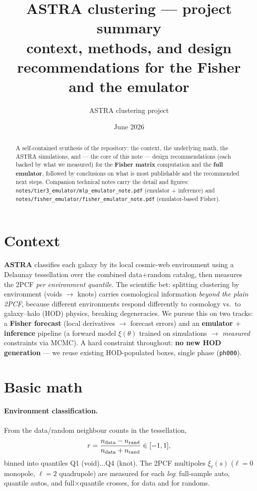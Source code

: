 \documentclass[11pt]{article}
\title{ASTRA clustering --- project summary\\
\large context, methods, and design recommendations for the Fisher and the emulator}
\author{ASTRA clustering project}\date{June 2026}
\newcommand{\code}[1]{\texttt{#1}}
\begin{document}
\maketitle

\begin{abstract}
A self-contained synthesis of the repository: the context, the underlying math, the
ASTRA simulations, and --- the core of this note --- design recommendations (each backed
by what we measured) for the \textbf{Fisher matrix} computation and the \textbf{full
emulator}, followed by conclusions on what is most publishable and the recommended next
steps. Companion technical notes carry the detail and figures:
\code{notes/tier3\_emulator/mlp\_emulator\_note.pdf} (emulator $+$ inference) and
\code{notes/fisher\_emulator/fisher\_emulator\_note.pdf} (emulator-based Fisher).
\end{abstract}

\section{Context}
\textbf{ASTRA} classifies each galaxy by its local cosmic-web environment using a
Delaunay tessellation over the combined data$+$random catalog, then measures the 2PCF
\emph{per environment quantile}. The scientific bet: splitting clustering by environment
(voids $\to$ knots) carries cosmological information \emph{beyond the plain 2PCF},
because different environments respond differently to cosmology vs.\ to galaxy--halo
(HOD) physics, breaking degeneracies. We pursue this on two tracks: a \textbf{Fisher
forecast} (local derivatives $\to$ forecast errors) and an \textbf{emulator $+$
inference} pipeline (a forward model $\xi(\theta)$ trained on simulations $\to$
\emph{measured} constraints via MCMC). A hard constraint throughout: \textbf{no new HOD
generation} --- we reuse existing HOD-populated boxes, single phase (\code{ph000}).

\section{Basic math}
\paragraph{Environment classification.} From the data/random neighbour counts in the
tessellation,
\[
r=\frac{n_{\rm data}-n_{\rm rand}}{n_{\rm data}+n_{\rm rand}}\in[-1,1],
\]
binned into quantiles Q1 (void)$\dots$Q4 (knot). The 2PCF multipoles $\xi_\ell(s)$
($\ell=0$ monopole, $\ell=2$ quadrupole) are measured for each \emph{leg}: full-sample
auto, quantile autos, and full$\times$quantile crosses, for data and for randoms.
\end{document}
